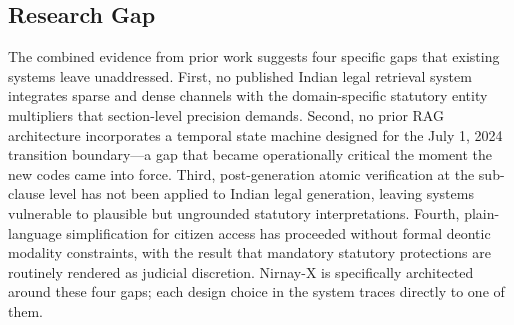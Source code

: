 \documentclass[conference]{IEEEtran}
\begin{document}
\subsection{Research Gap}
The combined evidence from prior work suggests four specific gaps that existing systems leave unaddressed. First, no published Indian legal retrieval system integrates sparse and dense channels with the domain-specific statutory entity multipliers that section-level precision demands. Second, no prior RAG architecture incorporates a temporal state machine designed for the July 1, 2024 transition boundary---a gap that became operationally critical the moment the new codes came into force. Third, post-generation atomic verification at the sub-clause level has not been applied to Indian legal generation, leaving systems vulnerable to plausible but ungrounded statutory interpretations. Fourth, plain-language simplification for citizen access has proceeded without formal deontic modality constraints, with the result that mandatory statutory protections are routinely rendered as judicial discretion. Nirnay-X is specifically architected around these four gaps; each design choice in the system traces directly to one of them.
\end{document}
